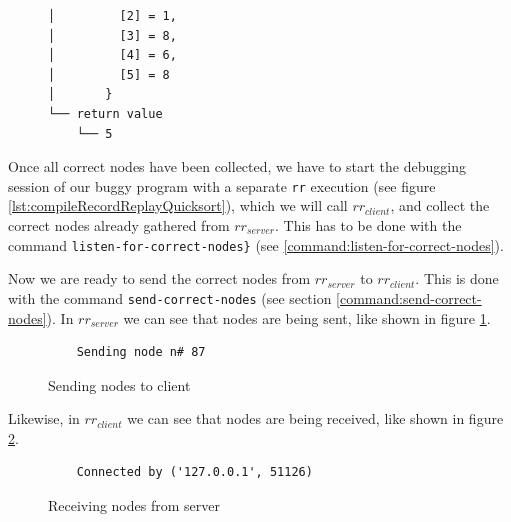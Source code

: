 \begin{figure}[h]
\begin{verbatim}
│         [2] = 1,                                                                                                                                    
│         [3] = 8,                                                                                                                                    
│         [4] = 6,                                                                                                                                    
│         [5] = 8                                                                                                                                     
│       }                                                                                                                                             
└── return value                                                                                                                                      
    └── 5
    \end{verbatim}
\end{figure}
Once all correct nodes have been collected, we have to start the debugging session of our buggy program with a separate \verb|rr| execution (see figure \ref{lst:compileRecordReplayQuicksort}), which we will call \(rr_{client}\), and collect the correct nodes already gathered from \(rr_{server}\). This has to be done with the command \verb|listen-for-correct-nodes}| (see \ref{command:listen-for-correct-nodes}). 

Now we are ready to send the correct nodes from \(rr_{server}\) to \(rr_{client}\). This is done with the command \verb|send-correct-nodes| (see section \ref{command:send-correct-nodes}).
In \(rr_{server}\) we can see that nodes are being sent, like shown in figure \ref{fig:sendingNode}.
\begin{figure}[h]
    \centering
    \caption{Sending nodes to client}
    \label{fig:sendingNode}
    \begin{verbatim}
    Sending node n# 87
    \end{verbatim}
\end{figure}
Likewise, in \(rr_{client}\) we can see that nodes are being received, like shown in figure \ref{fig:receivingNode}.
\begin{figure}[h]
    \centering
    \caption{Receiving nodes from server}
    \label{fig:receivingNode}
    \begin{verbatim}
    Connected by ('127.0.0.1', 51126)
    \end{verbatim}
\end{figure}

